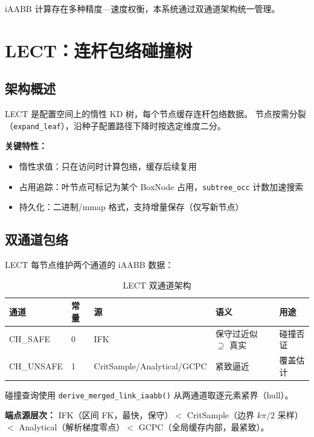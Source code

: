 \documentclass[11pt,a4paper]{article}
\begin{document}
iAABB 计算存在多种精度—速度权衡，本系统通过双通道架构统一管理。


\section{LECT：连杆包络碰撞树}
\label{sec:lect}

\subsection{架构概述}

LECT 是配置空间上的惰性 KD 树，每个节点缓存连杆包络数据。
节点按需分裂（\texttt{expand\_leaf}），沿种子配置路径下降时按选定维度二分。

\textbf{关键特性：}
\begin{itemize}[nosep]
  \item 惰性求值：只在访问时计算包络，缓存后续复用
  \item 占用追踪：叶节点可标记为某个 BoxNode 占用，\texttt{subtree\_occ} 计数加速搜索
  \item 持久化：二进制/mmap 格式，支持增量保存（仅写新节点）
\end{itemize}

\subsection{双通道包络}

LECT 每节点维护两个通道的 iAABB 数据：

\begin{table}[ht]
\centering
\caption{LECT 双通道架构}
\label{tab:channels}
\begin{tabular}{@{}lllll@{}}
\toprule
\textbf{通道} & \textbf{常量} & \textbf{源} & \textbf{语义} & \textbf{用途} \\
\midrule
CH\_SAFE & 0 & IFK & 保守过近似 $\supseteq$ 真实 & 碰撞否证 \\
CH\_UNSAFE & 1 & CritSample/Analytical/GCPC & 紧致逼近 & 覆盖估计 \\
\bottomrule
\end{tabular}
\end{table}

碰撞查询使用 \texttt{derive\_merged\_link\_iaabb()} 从两通道取逐元素紧界（hull）。

\textbf{端点源层次：}
IFK（区间 FK，最快，保守）$<$ CritSample（边界 $k\pi/2$ 采样）$<$
Analytical（解析梯度零点）$<$ GCPC（全局缓存内部，最紧致）。
\end{document}
